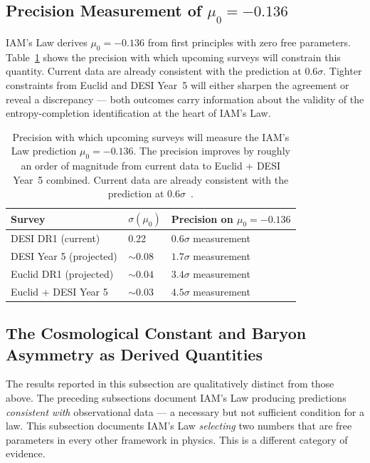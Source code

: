 \documentclass[12pt,a4paper]{article}
\begin{document}
\subsection{Precision Measurement of $\mu_0 = -0.136$}

IAM's Law derives $\mu_0 = -0.136$ from first principles with zero
free parameters. Table~\ref{tab:precision} shows the precision with
which upcoming surveys will constrain this quantity. Current data
are already consistent with the prediction at $0.6\sigma$. Tighter
constraints from Euclid and DESI Year~5 will either sharpen the
agreement or reveal a discrepancy --- both outcomes carry information
about the validity of the entropy-completion identification at the
heart of IAM's Law.

\begin{table}[h]
\centering
\small
\caption{Precision with which upcoming surveys will measure the
IAM's Law prediction $\mu_0 = -0.136$. The precision improves by
roughly an order of magnitude from current data to Euclid + DESI
Year~5 combined. Current data are already consistent with the
prediction at $0.6\sigma$~\citep{IAM_archive}.}
\label{tab:precision}
\begin{tabular}{p{4.5cm}p{2.2cm}p{4.5cm}}
\toprule
\textbf{Survey} & \textbf{$\sigma(\mu_0)$} &
\textbf{Precision on $\mu_0 = -0.136$} \\
\midrule
DESI DR1 (current)~\citep{IAM_archive} & 0.22 & $0.6\sigma$ measurement \\
DESI Year 5 (projected) & $\sim 0.08$ & $1.7\sigma$ measurement \\
Euclid DR1 (projected)~\citep{Frusciante2025} & $\sim 0.04$ &
  $3.4\sigma$ measurement \\
Euclid + DESI Year 5 & $\sim 0.03$ & $4.5\sigma$ measurement \\
\bottomrule
\end{tabular}
\end{table}

\subsection{The Cosmological Constant and Baryon Asymmetry as Derived
Quantities}
\label{sec:cc_baryon}

The results reported in this subsection are qualitatively distinct from
those above. The preceding subsections document IAM's Law producing
predictions \textit{consistent with} observational data --- a necessary
but not sufficient condition for a law. This subsection documents
IAM's Law \textit{selecting} two numbers that are free parameters in
every other framework in physics. This is a different category of evidence.
\end{document}
